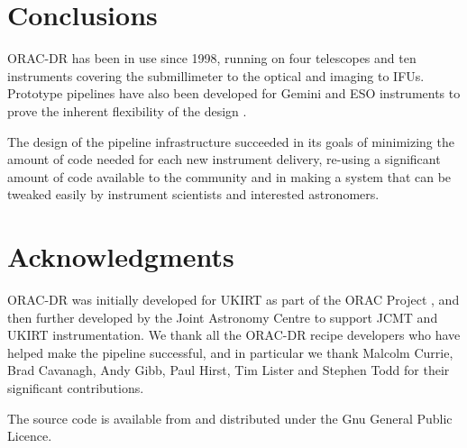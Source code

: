 \documentclass[final,authoryear,5p,times,twocolumn]{elsarticle}
\begin{document}
\section{Conclusions}

ORAC-DR has been in use since 1998, running on four telescopes and ten
instruments covering the submillimeter to the optical and imaging to
IFUs. Prototype pipelines have also been developed for Gemini and ESO
instruments to prove the inherent flexibility of the design
\citep{2003ASPC..295..237C,2004ASPC..314..460C}.

The design of the pipeline infrastructure succeeded in its goals of minimizing
the amount of code needed for each new instrument delivery, re-using a
significant amount of code available to the community and in making a
system that can be tweaked easily by instrument scientists and
interested astronomers.


\section*{Acknowledgments}

ORAC-DR was initially developed for UKIRT as part of the ORAC Project
\citep{1998SPIE.3349..184B}, and then further developed by the Joint
Astronomy Centre to support JCMT and UKIRT instrumentation. We thank
all the ORAC-DR recipe developers who have helped make the pipeline
successful, and in particular we thank  Malcolm Currie, Brad Cavanagh,
Andy Gibb, Paul Hirst,  Tim Lister and Stephen Todd for their
significant contributions.

The source
code is available from
and distributed under the Gnu General Public Licence.
\end{document}
